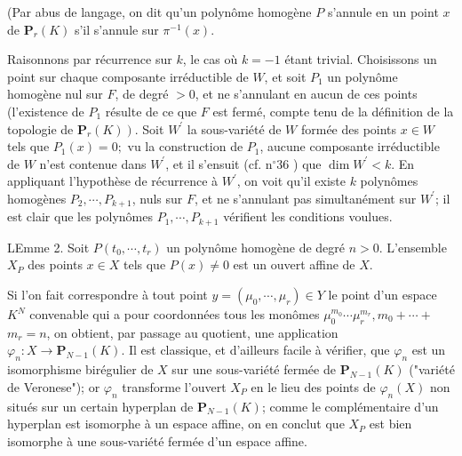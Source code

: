 (Par abus de langage, on dit qu'un polynôme homogène $P$ s'annule en un point $x$ de $\mathbf{P}_{r}(K)$ s'il s'annule sur $\pi^{-1}(x)$.

Raisonnons par récurrence sur $k$, le cas où $k=-1$ étant trivial. Choisissons un point sur chaque composante irréductible de $W$, et soit $P_{1}$ un polynôme homogène nul sur $F$, de degré $>0$, et ne s'annulant en aucun de ces points (l'existence de $P_{1}$ résulte de ce que $F$ est fermé, compte tenu de la définition de la topologie de $\left.\mathbf{P}_{r}(K)\right) .$ Soit $W^{\prime}$ la sous-variété de $W$ formée des points $x \in W$ tels que $P_{1}(x)=0 ;$ vu la construction de $P_{1}$, aucune composante irréductible de $W$ n'est contenue dans $W^{\prime}$, et il s'ensuit (cf. $\mathrm{n}^{\circ} 36$ ) que $\operatorname{dim} W^{\prime}<k$. En appliquant l'hypothèse de récurrence à $W^{\prime}$, on voit qu'il existe $k$ polynômes homogènes $P_{2}, \cdots, P_{k+1}$, nuls sur $F$, et ne s'annulant pas simultanément sur $W^{\prime}$; il est clair que les polynômes $P_{1}, \cdots, P_{k+1}$ vérifient les conditions voulues.

LEmme 2. Soit $P\left(t_{0}, \cdots, t_{r}\right)$ un polynôme homogène de degré $n>0 .$ L'ensemble $X_{P}$ des points $x \in X$ tels que $P(x) \neq 0$ est un ouvert affine de $X$.

Si l'on fait correspondre à tout point $y=\left(\mu_{0}, \cdots, \mu_{r}\right) \in Y$ le point d'un espace $K^{N}$ convenable qui a pour coordonnées tous les monômes $\mu_{0}^{m_{0}} \cdots \mu_{r}^{m_{r}}, m_{0}+\cdots+$ $m_{r}=n$, on obtient, par passage au quotient, une application $\varphi_{n}: X \rightarrow \mathbf{P}_{N-1}(K)$. Il est classique, et d'ailleurs facile à vérifier, que $\varphi_{n}$ est un isomorphisme birégulier de $X$ sur une sous-variété fermée de $\mathbf{P}_{N-1}(K)$ ("variété de Veronese"); or $\varphi_{n}$ transforme l'ouvert $X_{P}$ en le lieu des points de $\varphi_{n}(X)$ non situés sur un certain hyperplan de $\mathbf{P}_{N-1}(K)$; comme le complémentaire d'un hyperplan est isomorphe à un espace affine, on en conclut que $X_{P}$ est bien isomorphe à une sous-variété fermée d'un espace affine.

